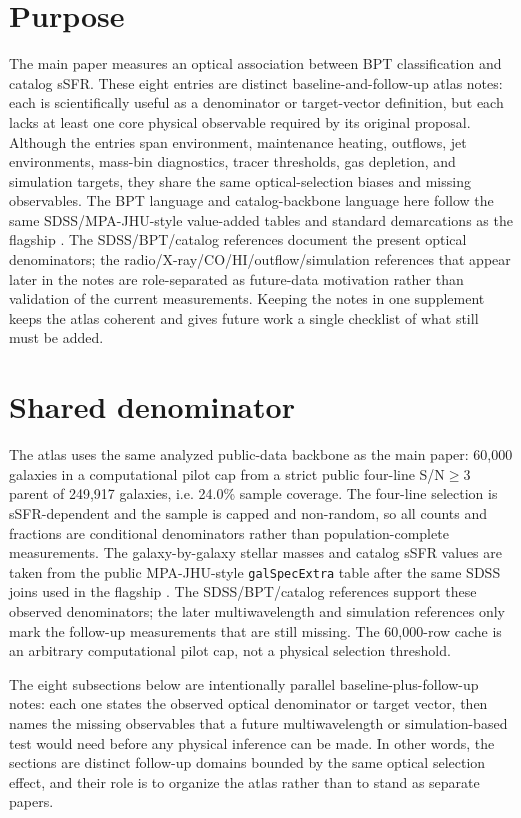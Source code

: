 \documentclass[twocolumn]{aastex631}
\begin{document}
\section{Purpose}
The main paper measures an optical association between BPT classification and catalog sSFR. These eight entries are distinct baseline-and-follow-up atlas notes: each is scientifically useful as a denominator or target-vector definition, but each lacks at least one core physical observable required by its original proposal. Although the entries span environment, maintenance heating, outflows, jet environments, mass-bin diagnostics, tracer thresholds, gas depletion, and simulation targets, they share the same optical-selection biases and missing observables. The BPT language and catalog-backbone language here follow the same SDSS/MPA-JHU-style value-added tables and standard demarcations as the flagship \citep{sdssdr17,brinchmann2004,york2000,baldwin1981,kewley2001,kauffmann2003bpt,kewley2006,stasinska2008,stasinska2015}. The SDSS/BPT/catalog references document the present optical denominators; the radio/X-ray/CO/HI/outflow/simulation references that appear later in the notes are role-separated as future-data motivation rather than validation of the current measurements. Keeping the notes in one supplement keeps the atlas coherent and gives future work a single checklist of what still must be added.

\section{Shared denominator}
The atlas uses the same analyzed public-data backbone as the main paper: 60,000 galaxies in a computational pilot cap from a strict public four-line S/N$\geq3$ parent of 249,917 galaxies, i.e. 24.0\% sample coverage. The four-line selection is sSFR-dependent and the sample is capped and non-random, so all counts and fractions are conditional denominators rather than population-complete measurements. The galaxy-by-galaxy stellar masses and catalog sSFR values are taken from the public MPA-JHU-style \texttt{galSpecExtra} table after the same SDSS joins used in the flagship \citep{sdssdr17,brinchmann2004,york2000}. The SDSS/BPT/catalog references support these observed denominators; the later multiwavelength and simulation references only mark the follow-up measurements that are still missing. The 60,000-row cache is an arbitrary computational pilot cap, not a physical selection threshold.

The eight subsections below are intentionally parallel baseline-plus-follow-up notes: each one states the observed optical denominator or target vector, then names the missing observables that a future multiwavelength or simulation-based test would need before any physical inference can be made. In other words, the sections are distinct follow-up domains bounded by the same optical selection effect, and their role is to organize the atlas rather than to stand as separate papers.
\end{document}
